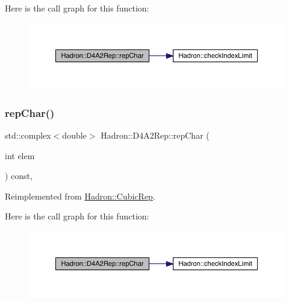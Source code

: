 Here is the call graph for this function\+:
\nopagebreak
\begin{figure}[H]
\begin{center}
\leavevmode
\includegraphics[width=350pt]{d7/d66/structHadron_1_1D4A2Rep_ac408f55785ba08ce215277bb1cb4a006_cgraph}
\end{center}
\end{figure}
\mbox{\label{structHadron_1_1D4A2Rep_ac408f55785ba08ce215277bb1cb4a006}} 
\subsubsection{\texorpdfstring{repChar()}{repChar()}\hspace{0.1cm}{\footnotesize\ttfamily [2/2]}}
{\footnotesize\ttfamily std\+::complex$<$double$>$ Hadron\+::\+D4\+A2\+Rep\+::rep\+Char (\begin{DoxyParamCaption}\item[{int}]{elem }\end{DoxyParamCaption}) const\hspace{0.3cm}{\ttfamily [inline]}, {\ttfamily [virtual]}}



Reimplemented from \mbox{\hyperlink{structHadron_1_1CubicRep_af45227106e8e715e84b0af69cd3b36f8}{Hadron\+::\+Cubic\+Rep}}.

Here is the call graph for this function\+:
\nopagebreak
\begin{figure}[H]
\begin{center}
\leavevmode
\includegraphics[width=350pt]{d7/d66/structHadron_1_1D4A2Rep_ac408f55785ba08ce215277bb1cb4a006_cgraph}
\end{center}
\end{figure}
\mbox{\label{structHadron_1_1D4A2Rep_a278dadc5305417dfc7dd7a8e1ae642d4}} 
